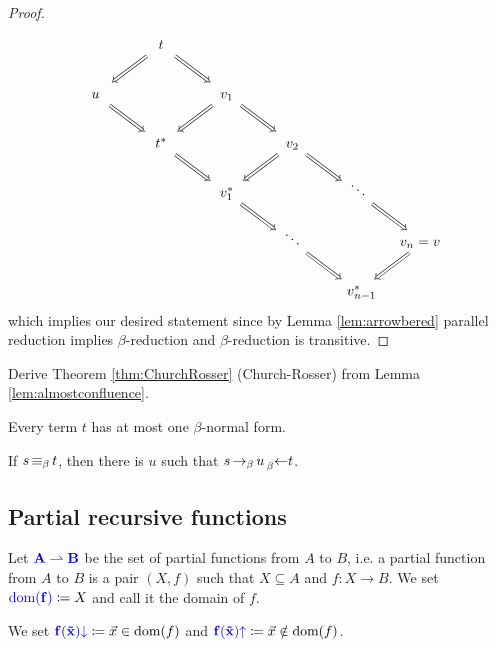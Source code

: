 \begin{proof}
\begin{equation*}
\begin{tikzcd}[/tikz/cells={/tikz/nodes={shape=asymmetrical
            rectangle,text width=0.5cm,text height=2ex,text depth=0.3ex,align=center}}]
            & t \ar[dl, Rightarrow] \ar[dr, Rightarrow] & \\
            u \ar[dr, Rightarrow] && v_1 \ar[dr, Rightarrow] \ar[dl, Rightarrow] \\
            & t^* \ar[dr, Rightarrow] && v_2 \ar[dr, Rightarrow] \ar[dl, Rightarrow] \\
            && v_1^* \ar[dr, Rightarrow] && \ddots \ar[dr, Rightarrow] \\
            &&& \ddots \ar[dr, Rightarrow] && \mathllap{v_n} = \mathrlap{v} \ar[dl, Rightarrow]\\
            &&&&\mathllap{v}_{n\mathrlap{-1}}^*
        \end{tikzcd}
    \end{equation*}
    which implies our desired statement since by Lemma \ref{lem:arrowbered} parallel reduction implies $\beta$-reduction and $\beta$-reduction is transitive. 
\end{proof}

\begin{exercise}
    Derive Theorem \ref{thm:ChurchRosser} (Church-Rosser) from Lemma \ref{lem:almostconfluence}.
\end{exercise}

\begin{boxcor}
    Every term $t$ has at most one $\beta$-normal form.
\end{boxcor}

\begin{boxcor}
    If $s \operatorname{\equiv_{\beta}} t$, then there is $u$ such that $s \operatorname{\to_{\beta}} u \prescript{}{\beta}{\leftarrow} t$.
\end{boxcor}

\subsection{Partial recursive functions}

\begin{boxdefi}
    Let $\alert{A \rightharpoonup B}$ be the set of \alert{partial functions} from $A$ to $B$, i.e. a partial function from $A$ to $B$ is a pair $(X, f)$ such that $X \subseteq A$ and $f \colon X \to B$.
    We set $\alert{\domain{f}} \coloneq X$ and call it the \alert{domain} of $f$.
\end{boxdefi}

\begin{notation}
    We set $\alert{f(\vec{x})\down} \coloneq \vec{x} \in \domain{f}$ and $\alert{f(\vec{x})\up} \coloneq \vec{x} \notin \domain{f}$.
\end{notation}

